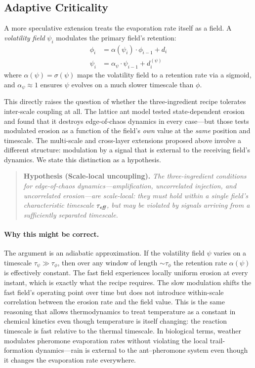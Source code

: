 \documentclass[11pt,a4paper]{article}
\newcommand{\retain}{\alpha}
\begin{document}
\subsection{Adaptive Criticality}
\label{sec:adaptive_crit}

A more speculative extension treats the evaporation rate itself as a
field.  A \emph{volatility field} $\psi_i$ modulates the primary
field's retention:
\begin{align}
    \phi_i &= \retain(\psi_i) \cdot \phi_{i-1} + d_i
    \label{eq:adaptive_phi} \\
    \psi_i &= \retain_\psi \cdot \psi_{i-1} + d_i^{(\psi)}
    \label{eq:volatility_field}
\end{align}
where $\retain(\psi) = \sigma(\psi)$ maps the volatility field to a
retention rate via a sigmoid, and $\retain_\psi \approx 1$ ensures
$\psi$ evolves on a much slower timescale than $\phi$.

This directly raises the question of whether the three-ingredient
recipe tolerates inter-scale coupling at all.  The lattice ant model
tested state-dependent erosion and found that it destroys
edge-of-chaos dynamics in every case---but those tests modulated
erosion as a function of the field's \emph{own} value at the
\emph{same} position and timescale.  The multi-scale and cross-layer
extensions proposed above involve a different structure: modulation
by a signal that is external to the receiving field's dynamics.  We
state this distinction as a hypothesis.

\begin{quote}
\textbf{Hypothesis (Scale-local uncoupling).}
\emph{The three-ingredient conditions for edge-of-chaos
dynamics---amplification, uncorrelated injection, and uncorrelated
erosion---are scale-local: they must hold within a single field's
characteristic timescale $\tau_{\emph{eff}}$, but may be violated by
signals arriving from a sufficiently separated timescale.}
\end{quote}

\paragraph{Why this might be correct.}
The argument is an adiabatic approximation.  If the volatility field
$\psi$ varies on a timescale $\tau_\psi \gg \tau_\phi$, then over
any window of length $\sim\!\tau_\phi$ the retention rate
$\retain(\psi)$ is effectively constant.  The fast field experiences
locally uniform erosion at every instant, which is exactly what the
recipe requires.  The slow modulation shifts the fast field's
operating point over time but does not introduce within-scale
correlation between the erosion rate and the field value.  This is
the same reasoning that allows thermodynamics to treat temperature as
a constant in chemical kinetics even though temperature is itself
changing: the reaction timescale is fast relative to the thermal
timescale.  In biological terms, weather modulates pheromone
evaporation rates without violating the local trail-formation
dynamics---rain is external to the ant--pheromone system even though
it changes the evaporation rate everywhere.
\end{document}
